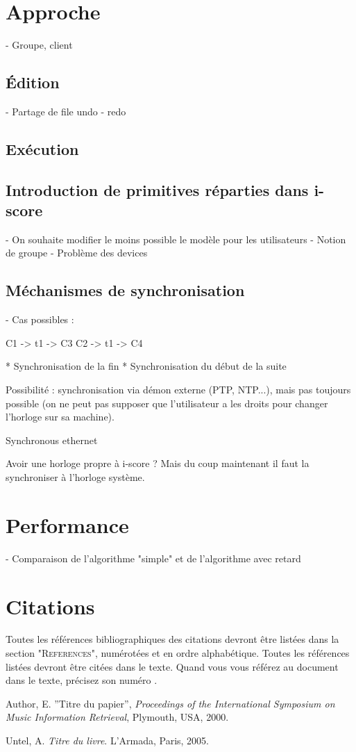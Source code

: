 \documentclass{article}
\begin{document}
\section{Approche}
- Groupe, client
\subsection{Édition}
- Partage de file undo - redo

\subsection{Exécution}

\subsection{Introduction de primitives réparties dans i-score}
- On souhaite modifier le moins possible le modèle pour les utilisateurs
- Notion de groupe
- Problème des devices

\subsection{Méchanismes de synchronisation}
- Cas possibles : 

C1 -> t1 -> C3
C2 -> t1 -> C4

* Synchronisation de la fin
* Synchronisation du début de la suite

Possibilité : synchronisation via démon externe (PTP, NTP...), mais pas toujours possible (on ne peut pas supposer que l'utilisateur a les droits pour changer l'horloge sur sa machine).

Synchronous ethernet

Avoir une horloge propre à i-score ? Mais du coup maintenant il faut la synchroniser à l'horloge système.


\section{Performance}
- Comparaison de l'algorithme "simple" et de l'algorithme avec retard
\section{Citations}

Toutes les références bibliographiques des citations devront être listées dans la section "\textsc{References}", numérotées et en ordre alphabétique. Toutes les références  listées devront être citées dans le texte. Quand  vous vous référez au document dans le texte, précisez son numéro \cite{Author:00}.

\begin{thebibliography}{2}

 Author, E.
''Titre du papier'',
{\it Proceedings of the International Symposium on Music Information
Retrieval}, Plymouth, USA, 2000.

 Untel, A.
{\it  Titre du livre}.
L'Armada, Paris, 2005.

\end{thebibliography}
\end{document}
